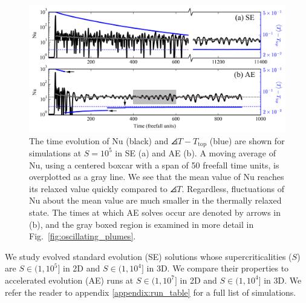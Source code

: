 \begin{figure}[bt!]
\includegraphics[width=\textwidth]{./figs/nu_v_time.pdf}
\caption[Time evolution of the Nusselt number in AE vs SE]
{
	The time evolution of Nu (black) and $\angles{T} - T_{\text{top}}$ (blue) are shown for simulations at $S = 10^5$ in SE (a) and AE (b).
	A moving average of Nu, using a centered boxcar with a span of 50 freefall time units, is overplotted as a gray line. 
	We see that the mean value of Nu reaches its relaxed value quickly compared to $\angles{T}$.
	Regardless, fluctuations of Nu about the mean value are much smaller in the thermally relaxed state.
	The times at which AE solves occur are denoted by arrows in (b), and the gray boxed region is examined in more detail in Fig.~\ref{fig:oscillating_plumes}.
	\label{fig:nu_v_time} 
}
\end{figure}


We study evolved standard evolution (SE) solutions whose supercriticalities ($S$) are $S \in (1, 10^5]$ in 2D and $S \in (1, 10^4]$ in 3D.
We compare their properties to accelerated evolution (AE) runs at $S \in (1, 10^7]$ in 2D and $S \in (1, 10^4]$ in 3D. 
We refer the reader to appendix \ref{appendix:run_table} for a full list of simulations.

